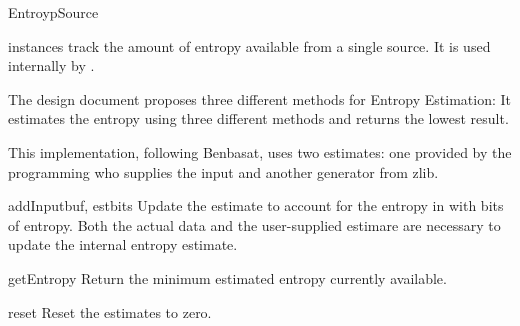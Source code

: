 \documentclass{howto}
\begin{document}
\begin{classdesc}{EntroypSource}{}

 instances track the amount of entropy available
from a single source.  It is used internally by .

The design document proposes three different methods for Entropy
Estimation: It estimates the entropy using three different methods and
returns the lowest result.

This implementation, following Benbasat, uses two estimates: one
provided by the programming who supplies the input and another
generator from zlib.

\begin{methoddesc}{addInput}{buf, estbits}
Update the estimate to account for the entropy in  with
 bits of entropy.  Both the actual data and the
user-supplied estimare are necessary to update the internal entropy
estimate. 
\end{methoddesc}

\begin{methoddesc}{getEntropy}{}
Return the minimum estimated entropy currently available.
\end{methoddesc}

\begin{methoddesc}{reset}{}
Reset the estimates to zero.
\end{methoddesc}

\end{classdesc}
\end{document}
